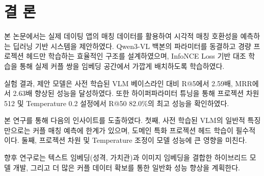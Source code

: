 \section{결 론}

본 논문에서는 실제 데이팅 앱의 매칭 데이터를 활용하여 시각적 매칭 호환성을 예측하는 딥러닝 기반 시스템을 제안하였다. Qwen3-VL 백본의 파라미터를 동결하고 경량 프로젝션 헤드만 학습하는 효율적인 구조를 설계하였으며, InfoNCE Loss 기반 대조 학습을 통해 실제 커플 쌍을 임베딩 공간에서 가깝게 배치하도록 학습하였다.

실험 결과, 제안 모델은 사전 학습된 VLM 베이스라인 대비 R@5에서 2.59배, MRR에서 2.63배 향상된 성능을 달성하였다. 또한 하이퍼파라미터 튜닝을 통해 프로젝션 차원 512 및 Temperature 0.2 설정에서 R@50 82.0\%의 최고 성능을 확인하였다.

본 연구를 통해 다음의 인사이트를 도출하였다. 첫째, 사전 학습된 VLM의 일반적 특징만으로는 커플 매칭 예측에 한계가 있으며, 도메인 특화 프로젝션 헤드 학습이 필수적이다. 둘째, 프로젝션 차원 및 Temperature 조정이 모델 성능에 큰 영향을 미친다.

향후 연구로는 텍스트 임베딩(성격, 가치관)과 이미지 임베딩을 결합한 하이브리드 모델 개발, 그리고 더 많은 커플 데이터 확보를 통한 일반화 성능 향상을 계획한다.
